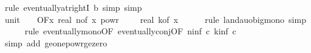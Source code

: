 \begin{isabellebody}
\ {\isacharparenleft}{\kern0pt}rule\ eventually{\isacharunderscore}{\kern0pt}at{\isacharunderscore}{\kern0pt}rightI{\isacharbrackleft}{\kern0pt}\ b{\isacharequal}{\kern0pt}{\isachardoublequoteopen}{}{\isachardoublequoteclose}{\isacharbrackright}{\kern0pt}{\isacharcomma}{\kern0pt}\ simp{\isacharcomma}{\kern0pt}\ simp{\isacharparenright}{\kern0pt}\isanewline
\isanewline
\ \ \isamarkupfalse%
\ unit{\isacharunderscore}{\kern0pt}{}{\isacharcolon}{\kern0pt}\ {\isachardoublequoteopen}{\isacharparenleft}{\kern0pt}{\isasymlambda}{\isacharunderscore}{\kern0pt}{\isachardot}{\kern0pt}\ {}{\isacharparenright}{\kern0pt}\ {\isasymin}\ O{\isacharbrackleft}{\kern0pt}{\isacharquery}{\kern0pt}F{\isacharbrackright}{\kern0pt}{\isacharparenleft}{\kern0pt}{\isasymlambda}x{\isachardot}{\kern0pt}\ real\ {\isacharparenleft}{\kern0pt}n{\isacharunderscore}{\kern0pt}of\ x{\isacharparenright}{\kern0pt}\ powr\ {\isacharparenleft}{\kern0pt}{}\ {\isacharminus}{\kern0pt}\ {}\ {\isacharslash}{\kern0pt}\ real\ {\isacharparenleft}{\kern0pt}k{\isacharunderscore}{\kern0pt}of\ x{\isacharparenright}{\kern0pt}{\isacharparenright}{\kern0pt}{\isacharparenright}{\kern0pt}{\isachardoublequoteclose}\isanewline
\ \ \ \ \isamarkupfalse%
\ {\isacharparenleft}{\kern0pt}rule\ landau{\isacharunderscore}{\kern0pt}o{\isachardot}{\kern0pt}big{\isacharunderscore}{\kern0pt}mono{\isacharcomma}{\kern0pt}\ simp{\isacharparenright}{\kern0pt}\isanewline
\ \ \ \ \isamarkupfalse%
\ {\isacharparenleft}{\kern0pt}rule\ eventually{\isacharunderscore}{\kern0pt}mono{\isacharbrackleft}{\kern0pt}OF\ eventually{\isacharunderscore}{\kern0pt}conj{\isacharbrackleft}{\kern0pt}OF\ n{\isacharunderscore}{\kern0pt}inf{\isacharbrackleft}{\kern0pt}\ c{\isacharequal}{\kern0pt}{\isachardoublequoteopen}{}{\isachardoublequoteclose}{\isacharbrackright}{\kern0pt}\ k{\isacharunderscore}{\kern0pt}inf{\isacharbrackleft}{\kern0pt}\ c{\isacharequal}{\kern0pt}{\isachardoublequoteopen}{}{\isachardoublequoteclose}{\isacharbrackright}{\kern0pt}{\isacharbrackright}{\kern0pt}{\isacharbrackright}{\kern0pt}{\isacharparenright}{\kern0pt}\isanewline
\ \ \ \ \isamarkupfalse%
\ {\isacharparenleft}{\kern0pt}simp\ add{\isacharcolon}{\kern0pt}\ ge{\isacharunderscore}{\kern0pt}one{\isacharunderscore}{\kern0pt}powr{\isacharunderscore}{\kern0pt}ge{\isacharunderscore}{\kern0pt}zero{\isacharparenright}{\kern0pt}\isanewline
\isanewline
\ \ \isamarkupfalse%

\end{isabellebody}
